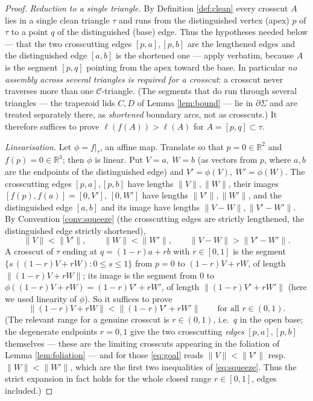 \documentclass[12pt]{article}
\newcommand{\R}{\mathbb{R}}
\newcommand{\Sig}{\Sigma}
\begin{document}
\begin{proof}
\emph{Reduction to a single triangle.} By Definition \ref{def:clean}
every crosscut $A$ lies in a single clean triangle $\tau$ and runs from
the distinguished vertex (apex) $p$ of $\tau$ to a point $q$ of the
distinguished (base) edge. Thus the hypotheses needed below — that the two
crosscutting edges $[p,a],[p,b]$ are the lengthened edges and the
distinguished edge $[a,b]$ is the shortened one — apply verbatim, because
$A$ is the segment $[p,q]$ pointing from the apex toward the base. In
particular \emph{no assembly across several triangles is required for a
crosscut}: a crosscut never traverses more than one $\mathcal C$-triangle.
(The segments that do run through several triangles — the trapezoid lids
$C,D$ of Lemma \ref{lem:bound} — lie in $\partial\Sig$ and are treated
separately there, as \emph{shortened} boundary arcs, not as crosscuts.)
It therefore suffices to prove $\ell(f(A))>\ell(A)$ for $A=[p,q]\subset\tau$.

\smallskip
\emph{Linearisation.} Let $\phi=f|_\tau$, an affine map. Translate so that
$p=0\in\R^2$ and $f(p)=0\in\R^3$; then $\phi$ is linear. Put $V=a,\ W=b$
(as vectors from $p$, where $a,b$ are the endpoints of the distinguished
edge) and $V'=\phi(V),\ W'=\phi(W)$. The crosscutting edges $[p,a],[p,b]$
have lengths $\|V\|,\|W\|$, their images $[f(p),f(a)]=[0,V'],\,[0,W']$ have
lengths $\|V'\|,\|W'\|$, and the distinguished edge $[a,b]$ and its image
have lengths $\|V-W\|,\|V'-W'\|$. By Convention \ref{conv:squeeze} (the
crosscutting edges are strictly lengthened, the distinguished edge
strictly shortened),
\begin{equation}\label{eq:squeeze}
\|V\|<\|V'\|,\qquad \|W\|<\|W'\|,\qquad \|V-W\|>\|V'-W'\|.
\end{equation}
A crosscut of $\tau$ ending at $q=(1-r)a+rb$ with $r\in[0,1]$ is the
segment $\{s\,((1-r)V+rW):0\le s\le1\}$ from $p=0$ to
$(1-r)V+rW$, of length $\|(1-r)V+rW\|$; its image is the segment from
$0$ to $\phi((1-r)V+rW)=(1-r)V'+rW'$, of length $\|(1-r)V'+rW'\|$
(here we used linearity of $\phi$). So it suffices to prove
\begin{equation}\label{eq:goal}
\|(1-r)V+rW\|<\|(1-r)V'+rW'\|\qquad\text{for all }r\in(0,1).
\end{equation}
(The relevant range for a genuine crosscut is $r\in(0,1)$, i.e.\ $q$ in
the open base; the degenerate endpoints $r=0,1$ give the two crosscutting
\emph{edges} $[p,a],[p,b]$ themselves — these are the limiting crosscuts
appearing in the foliation of Lemma \ref{lem:foliation} — and for those
\eqref{eq:goal} reads $\|V\|<\|V'\|$ resp.\ $\|W\|<\|W'\|$, which are the
first two inequalities of \eqref{eq:squeeze}. Thus the strict expansion
in fact holds for the whole closed range $r\in[0,1]$, edges included.)


\end{proof}
\end{document}
